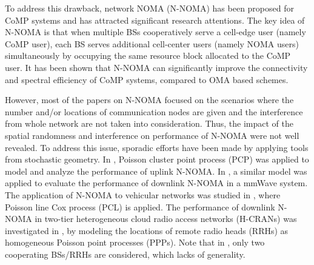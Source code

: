 \documentclass[10pt, doublecolumn]{IEEEtran}
\begin{document}
To address this drawback, network NOMA (N-NOMA) has been proposed for CoMP systems and has attracted significant research attentions\cite{choi2014non,ali2018downlink,sys2017nnomafeasibility}. The key idea of N-NOMA is that when multiple BSs cooperatively serve a cell-edge user (namely CoMP user), each BS serves additional cell-center users (namely NOMA users) simultaneously by occupying the same resource block allocated to the CoMP user. It has been shown that N-NOMA can significantly improve the connectivity and spectral efficiency of CoMP systems, compared to OMA based schemes.

{\color{black}However, most of the papers on N-NOMA focused on the scenarios where the number {\color{black}and/or} locations of communication nodes are given and the interference from whole network are not taken into consideration\cite{
elhattab2022joint,elhattab2022ris,wang2020power,elhattab2020joint}}. Thus, the impact of the spatial randomness and interference on performance of N-NOMA were not well revealed. To address this issue, sporadic efforts have been made by applying tools from stochastic geometry\cite{haenggi2012stochastic}. In \cite{sys2019PCP}, Poisson cluster point process (PCP) was applied to model and analyze the performance of uplink N-NOMA. In \cite{zhang2020performance}, a similar model was applied to evaluate the performance of downlink N-NOMA in a mmWave system. The application of N-NOMA to vehicular networks was studied in \cite{sun2021outage}, where Poisson line Cox process (PCL) is applied.
{\color{black}The performance of downlink N-NOMA in two-tier heterogeneous cloud radio access networks (H-CRANs) was investigated in \cite{elhattab2020comp},
by modeling the locations of remote radio heads (RRHs) as homogeneous Poisson point processes (PPPs).
Note that in \cite{zhang2020performance, sun2021outage,elhattab2020comp}, only two cooperating BSs/RRHs are considered, which lacks of generality.}
\end{document}
